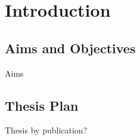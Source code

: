 \chapter{Introduction}

\section{Aims and Objectives}\label{s:aims}
Aims

\section{Thesis Plan}\label{s:thesisplan}
Thesis by publication?











